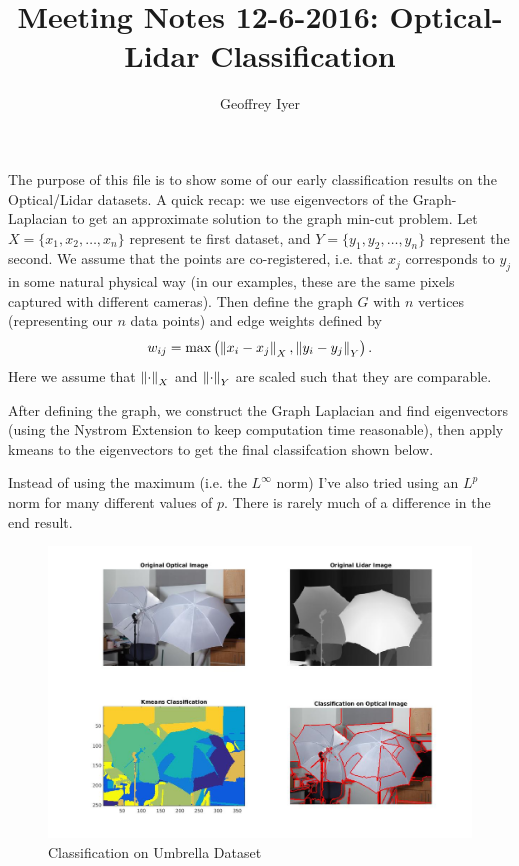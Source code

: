 
\usepackage{graphicx}



\title{Meeting Notes 12-6-2016: Optical-Lidar Classification}
\author{Geoffrey Iyer}
\maketitle

The purpose of this file is to show some of our early classification results on the Optical/Lidar datasets. A quick recap: we use eigenvectors of the Graph-Laplacian to get an approximate solution to the graph min-cut problem. Let $X = \{x_1,x_2,\ldots,x_n\}$ represent te first dataset, and $Y = \{y_1,y_2,\ldots,y_n\}$ represent the second. We assume that the points are co-registered, i.e. that $x_j$ corresponds to $y_j$ in some natural physical way (in our examples, these are the same pixels captured with different cameras). Then define the graph $G$ with $n$ vertices (representing our $n$ data points) and edge weights defined by
\[w_{ij} = \max\left(\left\lVert x_i - x_j\right\rVert_X , \left\lVert y_i-y_j\right\rVert_Y\right).\]
Here we assume that $\left\lVert\cdot\right\rVert_X$ and $\left\lVert\cdot\right\rVert_Y$ are scaled such that they are comparable.

After defining the graph, we construct the Graph Laplacian and find eigenvectors (using the Nystrom Extension to keep computation time reasonable), then apply kmeans to the eigenvectors to get the final classifcation shown below.

Instead of using the maximum (i.e. the $L^\infty$ norm) I've also tried using an $L^p$ norm for many different values of $p$. There is rarely much of a difference in the end result.

\begin{figure}
  \includegraphics[width = \textwidth]{Umbrella.jpg}
  \caption{Classification on Umbrella Dataset}
\end{figure}

